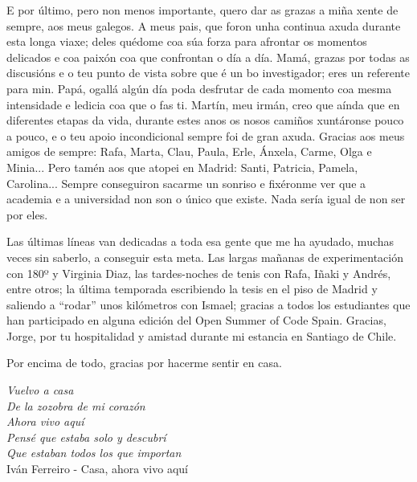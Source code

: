 \begin{acknowledgementslong}
E por último, pero non menos importante, quero dar as grazas  a miña xente de sempre, aos meus galegos. A meus pais, que foron unha continua axuda durante  esta longa viaxe; deles quédome coa súa forza para afrontar os momentos delicados e coa paixón coa que confrontan o día a día. Mamá, grazas por todas as discusións e o teu punto de vista sobre que é un bo investigador; eres un referente para min. Papá, ogallá algún día poda desfrutar de cada momento coa mesma intensidade e ledicia coa que o fas ti. Martín, meu irmán, creo que aínda que en diferentes etapas da vida, durante estes anos os nosos camiños xuntáronse pouco a pouco, e o teu apoio incondicional sempre foi de gran axuda. Gracias aos meus amigos de sempre: Rafa, Marta, Clau, Paula, Erle, Ánxela, Carme, Olga e Minia... Pero tamén aos que atopei en Madrid: Santi, Patricia, Pamela, Carolina... Sempre conseguiron sacarme un sonriso e fixéronme ver que a academia e a universidad non son o único que existe. Nada sería igual de non ser por eles.

Las últimas líneas van dedicadas a toda esa gente que me ha ayudado, muchas veces sin saberlo, a conseguir esta meta. Las largas mañanas de experimentación con 180º y Virginia Diaz, las tardes-noches de tenis con Rafa, Iñaki y Andrés, entre otros; la última temporada escribiendo la tesis en el piso de Madrid y saliendo a ``rodar'' unos kilómetros con Ismael; gracias a todos los estudiantes que han participado en alguna edición del Open Summer of Code Spain. Gracias, Jorge, por tu hospitalidad y amistad durante mi estancia en Santiago de Chile.

Por encima de todo, gracias por hacerme sentir en casa.

\vspace{10mm}

\textit{
\null\hfill Vuelvo a casa \\
\null\hfill De la zozobra de mi corazón \\
\null\hfill Ahora vivo aquí \\
\null\hfill Pensé que estaba solo y descubrí \\
\null\hfill Que estaban todos los que importan \vspace{6mm} \\
} 
\null\hfill Iván Ferreiro - Casa, ahora vivo aquí

\end{acknowledgementslong}









